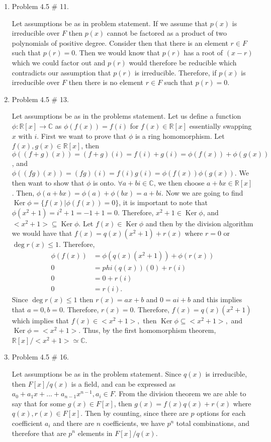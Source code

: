 \documentclass[11pt]{article}
\newcommand{\R}{\mathbb{R}}
\newcommand{\C}{\mathbb{C}}
\DeclareMathOperator{\Ker}{Ker}
\begin{document}
\begin{enumerate}

\item Problem 4.5 \# 11.

Let assumptions be as in problem statement. If we assume that $p(x)$ is irreducible over $F$ then $p(x)$ cannot be factored as a product of two polynomials of positive degree. Consider then that there is an element $r\in F$ such that $p(r) = 0$. Then we would know that $p(r)$ has a root of $(x-r)$ which we could factor out and $p(r)$ would therefore be reducible which contradicts our assumption that $p(r)$ is irreducible. Therefore, if $p(x)$ is irreducible over $F$ then there is no element $r\in F$ such that $p(r) = 0.$

\pagebreak
\item Problem 4.5 \# 13.

Let assumptions be as in the problems statement. Let us define a function $\phi: \R[x] \rightarrow \C$ as $\phi(f(x))=f(i)$ for $f(x)\in \R[x]$ essentially swapping $x$ with $i$. First we want to prove that $\phi$ is a ring homomorphism. Let $f(x),g(x)\in \R[x]$, then $\phi((f+g)(x)) = (f+g)(i) = f(i)+g(i) = \phi(f(x))+\phi(g(x))$, and $\phi((fg)(x)) = (fg)(i) = f(i)g(i) = \phi(f(x))\phi(g(x)).$ We then want to show that $\phi$ is onto. $\forall a+bi\in \C$, we then choose $a+bx\in \R[x]$. Then, $\phi(a+bx)=\phi(a)+\phi(bx) = a+bi$. Now we are going to find $\Ker\phi = \{f(x)|\phi(f(x))=0\}$, it is important to note that $\phi(x^2+1) = i^2 + 1 = -1 + 1 = 0$. Therefore, $x^2+1\in \Ker\phi$, and $<x^2+1>\subseteq \Ker\phi.$ Let $f(x)\in \Ker\phi$ and then by the division algorithm we would have that $f(x) = q(x)(x^2+1)+r(x)$ where $r=0$ or $\deg r(x) \leq 1.$ Therefore, 
\begin{align*}
    \phi(f(x)) &= \phi(q(x)(x^2+1))+\phi(r(x))\\
    0 &= phi(q(x))(0)+r(i)\\
    0 &= 0 + r(i)\\
    0 &= r(i).
\end{align*} Since $\deg r(x) \leq 1$ then $r(x) = ax+b$ and $0 = ai+b$ and this implies that $a = 0, b = 0.$ Therefore, $r(x) = 0.$ Therefore, $f(x) = q(x)(x^2+1)$ which implies that $f(x)\in <x^2+1>,$ then $\Ker\phi\subseteq<x^2+1>,$ and $\Ker\phi = <x^2+1>$. Thus, by the first homomorphism theorem, $\R[x]/<x^2+1>\simeq\C$.

\pagebreak
\item Problem 4.5 \# 16.

Let assumptions be as in the problem statement. Since $q(x)$ is irreducible, then $F[x]/q(x)$ is a field, and can be expressed as $a_0+a_1x+...+a_{n-1}x^{n-1}, a_i\in F$. From the division theorem we are able to say that for some $g(x)\in F[x]$, then $g(x)=f(x)q(x)+r(x)$ where $q(x),r(x)\in F[x].$ Then by counting, since there are $p$ options for each coefficient $a_i$ and there are $n$ coefficients, we have $p^n$ total combinations, and therefore that are $p^n$ elements in $F[x]/q(x).$


\end{enumerate}
\end{document}
